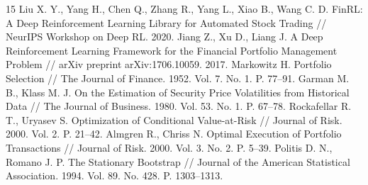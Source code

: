 \documentclass[11pt,a4paper]{article}
\begin{document}
\begin{thebibliography}{15}
 Liu X. Y., Yang H., Chen Q., Zhang R., Yang L., Xiao B., Wang C. D. FinRL: A Deep Reinforcement Learning Library for Automated Stock Trading // NeurIPS Workshop on Deep RL. 2020.
 Jiang Z., Xu D., Liang J. A Deep Reinforcement Learning Framework for the Financial Portfolio Management Problem // arXiv preprint arXiv:1706.10059. 2017.
 Markowitz H. Portfolio Selection // The Journal of Finance. 1952. Vol. 7. No. 1. P. 77--91.
 Garman M. B., Klass M. J. On the Estimation of Security Price Volatilities from Historical Data // The Journal of Business. 1980. Vol. 53. No. 1. P. 67--78.
 Rockafellar R. T., Uryasev S. Optimization of Conditional Value-at-Risk // Journal of Risk. 2000. Vol. 2. P. 21--42.
 Almgren R., Chriss N. Optimal Execution of Portfolio Transactions // Journal of Risk. 2000. Vol. 3. No. 2. P. 5--39.
 Politis D. N., Romano J. P. The Stationary Bootstrap // Journal of the American Statistical Association. 1994. Vol. 89. No. 428. P. 1303--1313.
\end{thebibliography}
\end{document}
